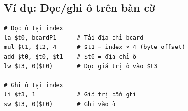 \subsection{Ví dụ: Đọc/ghi ô trên bàn cờ}

\begin{verbatim}
# Đọc ô tại index
la $t0, boardP1      # Tải địa chỉ board
mul $t1, $t2, 4      # $t1 = index × 4 (byte offset)
add $t0, $t0, $t1    # $t0 = địa chỉ ô
lw $t3, 0($t0)       # Đọc giá trị ô vào $t3

# Ghi ô tại index
li $t3, 1            # Giá trị cần ghi
sw $t3, 0($t0)       # Ghi vào ô
\end{verbatim}
